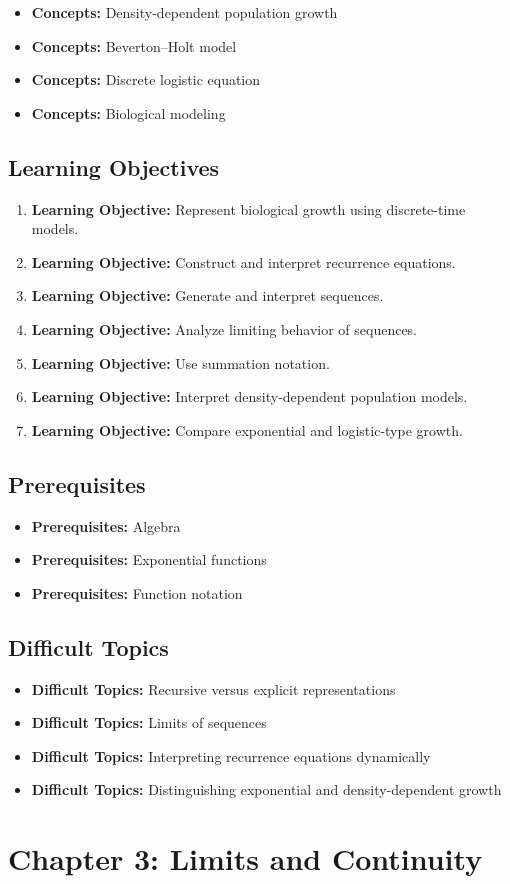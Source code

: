 \documentclass[11pt]{article}
\newcommand{\objective}[1]{\item \textbf{Learning Objective:} #1}
\newcommand{\concept}[1]{\item \textbf{Concepts:} #1}
\newcommand{\difficult}[1]{\item \textbf{Difficult Topics:} #1}
\newcommand{\prereq}[1]{\item \textbf{Prerequisites:} #1}
\begin{document}
\begin{itemize}
    \concept{Density-dependent population growth}
    \concept{Beverton--Holt model}
    \concept{Discrete logistic equation}
    \concept{Biological modeling}
\end{itemize}

\subsection{Learning Objectives}

\begin{enumerate}
    \objective{Represent biological growth using discrete-time models.}
    \objective{Construct and interpret recurrence equations.}
    \objective{Generate and interpret sequences.}
    \objective{Analyze limiting behavior of sequences.}
    \objective{Use summation notation.}
    \objective{Interpret density-dependent population models.}
    \objective{Compare exponential and logistic-type growth.}
\end{enumerate}

\subsection{Prerequisites}

\begin{itemize}
    \prereq{Algebra}
    \prereq{Exponential functions}
    \prereq{Function notation}
\end{itemize}

\subsection{Difficult Topics}

\begin{itemize}
    \difficult{Recursive versus explicit representations}
    \difficult{Limits of sequences}
    \difficult{Interpreting recurrence equations dynamically}
    \difficult{Distinguishing exponential and density-dependent growth}
\end{itemize}


\section{Chapter 3: Limits and Continuity}
\end{document}
